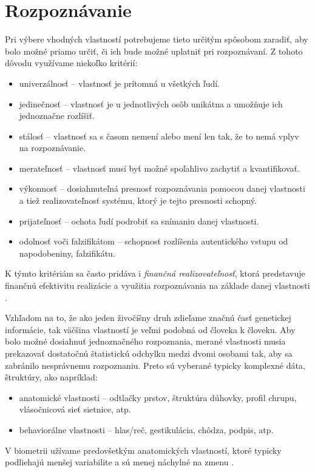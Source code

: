 \section{Rozpoznávanie}
Pri výbere vhodných vlastností potrebujeme tieto určitým spôsobom zaradiť, aby bolo možné priamo určiť, či ich bude možné uplatniť pri rozpoznávaní. Z tohoto dôvodu využívame niekoľko kritérií\cite{bio}:
\begin{itemize}
\item univerzálnosť -- vlastnosť je prítomná u všetkých ľudí.
\item jedinečnosť -- vlastnosť je u jednotlivých osôb unikátna a umožňuje ich jednoznačne rozlíšiť.
\item stálosť -- vlastnosť sa s časom nemení alebo mení len tak, že to nemá vplyv na rozpoznávanie.
\item merateľnosť -- vlastnosť musí byť možné spoľahlivo zachytiť a kvantifikovať.
\item výkonnosť -- dosiahnuteľná presnosť rozpoznávania pomocou danej vlastnosti a tiež realizovateľnosť systému, ktorý je tejto presnosti schopný.
\item prijateľnosť -- ochota ľudí podrobiť sa snímaniu danej vlastnosti.
\item odolnosť voči falzifikátom -- schopnosť rozlíšenia autentického vstupu od napodobeniny, falzifikátu.
\end{itemize}
K týmto kritériám sa často pridáva i \emph{finančná realizovateľnosť}, ktorá predstavuje finančnú efektivitu realizácie a využitia rozpoznávania na základe danej vlastnosti \cite{bio}.

Vzhľadom na to, že ako jeden živočíšny druh zdieľame značnú časť genetickej informácie, tak väčšina vlastností je veľmi podobná od človeka k človeku. Aby bolo možné dosiahnuť jednoznačného rozpoznania, merané vlastnosti musia prekazovať dostatočnú štatistickú odchylku medzi dvomi osobami tak, aby sa zabránilo nesprávnemu rozpoznaniu. Preto sú vyberané typicky komplexné dáta, štruktúry, ako napríklad\cite{bio}:
\begin{itemize}
\item anatomické vlastnosti -- odtlačky prstov, štruktúra dúhovky, profil chrupu, vlásočnicová sieť sietnice, atp.
\item behaviorálne vlastnosti -- hlas/reč, gestikulácia, chôdza, podpis, atp.
\end{itemize}
V biometrii užívame predovšetkým anatomických vlastností, ktoré typicky podliehajú menšej variabilite a sú menej náchylné na zmenu \cite{bio3}.

